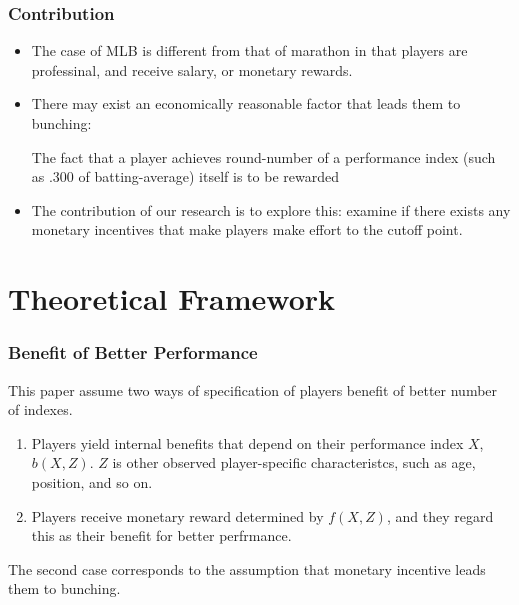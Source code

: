 \documentclass[dvipdfmx,12pt]{beamer}
\begin{document}
\begin{frame}\frametitle{Contribution}
  \begin{itemize}
    \item The case of MLB is different from that of marathon in that players are professinal, and receive salary, or monetary rewards.

    \item There may exist an economically reasonable factor that leads them to bunching:

    The fact that a player achieves round-number of a performance index (such as .300 of batting-average) itself is to be rewarded

    \item The contribution of our research is to explore this: examine if there exists any monetary incentives that make players make effort to the cutoff point.
  \end{itemize}
\end{frame}

\section{Theoretical Framework}

\begin{frame}\frametitle{Benefit of Better Performance}
  This paper assume two ways of specification of players benefit of better number of indexes.
  \begin{enumerate}
    \item Players yield internal benefits that depend on their performance index $X$, $b(X, Z)$. $Z$ is other observed player-specific characteristcs, such as age, position, and so on.

    \item Players receive monetary reward determined by $f(X, Z)$, and they regard this as their benefit for better perfrmance.
  \end{enumerate}

  The second case corresponds to the assumption that monetary incentive leads them to bunching.
\end{frame}
\end{document}

